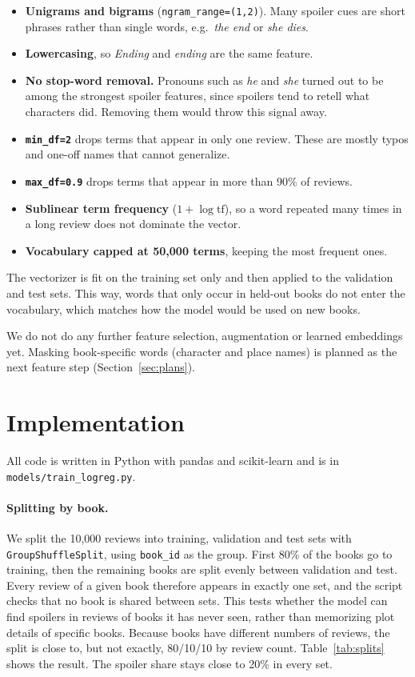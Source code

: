 \documentclass[11pt]{article}
\begin{document}
\begin{itemize}
  \setlength\itemsep{0pt}
  \item \textbf{Unigrams and bigrams} (\texttt{ngram\_range=(1,2)}). Many spoiler cues are short phrases rather than single words, e.g.\ \emph{the end} or \emph{she dies}.
  \item \textbf{Lowercasing}, so \emph{Ending} and \emph{ending} are the same feature.
  \item \textbf{No stop-word removal.} Pronouns such as \emph{he} and \emph{she} turned out to be among the strongest spoiler features, since spoilers tend to retell what characters did. Removing them would throw this signal away.
  \item \textbf{\texttt{min\_df=2}} drops terms that appear in only one review. These are mostly typos and one-off names that cannot generalize.
  \item \textbf{\texttt{max\_df=0.9}} drops terms that appear in more than 90\% of reviews.
  \item \textbf{Sublinear term frequency} ($1+\log \mathrm{tf}$), so a word repeated many times in a long review does not dominate the vector.
  \item \textbf{Vocabulary capped at 50{,}000 terms}, keeping the most frequent ones.
\end{itemize}

The vectorizer is fit on the training set only and then applied to the validation and test sets. This way, words that only occur in held-out books do not enter the vocabulary, which matches how the model would be used on new books.

We do not do any further feature selection, augmentation or learned embeddings yet. Masking book-specific words (character and place names) is planned as the next feature step (Section~\ref{sec:plans}).

\section{Implementation}
\label{sec:implementation}

All code is written in Python with pandas and scikit-learn and is in \texttt{models/train\_logreg.py}.

\paragraph{Splitting by book.}
We split the 10{,}000 reviews into training, validation and test sets with \texttt{GroupShuffleSplit}, using \texttt{book\_id} as the group. First 80\% of the books go to training, then the remaining books are split evenly between validation and test. Every review of a given book therefore appears in exactly one set, and the script checks that no book is shared between sets. This tests whether the model can find spoilers in reviews of books it has never seen, rather than memorizing plot details of specific books. Because books have different numbers of reviews, the split is close to, but not exactly, 80/10/10 by review count. Table~\ref{tab:splits} shows the result. The spoiler share stays close to 20\% in every set.
\end{document}
